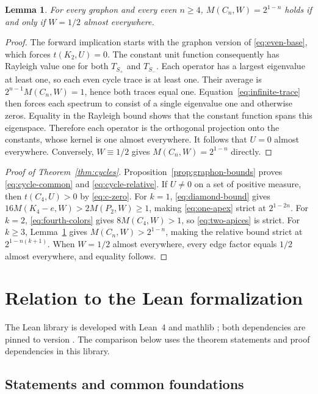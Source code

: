 \documentclass[11pt,a4paper]{article}
\newtheorem{lemma}[theorem]{Lemma}
\theoremstyle{remark}
\numberwithin{equation}{section}
\newcommand{\code}[1]{\texttt{\detokenize{#1}}}
\begin{document}
\begin{lemma}\label{lem:cycle-equality}
For every graphon and every even $n\geq4$,
$M(C_n,W)=2^{1-n}$ holds if and only if
$W=1/2$ almost everywhere.
\end{lemma}
\begin{proof}
The forward implication starts with the graphon version of
\eqref{eq:even-base}, which forces $t(K_2,U)=0$. The constant unit
function consequently has Rayleigh value one for both
$T_{S_+}$ and $T_{S_-}$. Each operator has a largest eigenvalue
at least one, so each even cycle trace is at least one.
Their average is $2^{n-1}M(C_n,W)=1$, hence both traces equal one.
Equation~\eqref{eq:infinite-trace} then forces each spectrum
to consist of a single eigenvalue one and otherwise zeros.
Equality in the Rayleigh bound shows that the constant function
spans this eigenspace. Therefore each operator is the orthogonal
projection onto the constants, whose kernel is one almost
everywhere. It follows that $U=0$ almost everywhere.
Conversely, $W\equiv1/2$ gives $M(C_n,W)=2^{1-n}$ directly.
\end{proof}

\begin{proof}[Proof of Theorem~\ref{thm:cycles}]
Proposition~\ref{prop:graphon-bounds} proves
\eqref{eq:cycle-common} and
\eqref{eq:cycle-relative}. If $U\ne0$ on a set of positive
measure, then $t(C_4,U)>0$ by \eqref{eq:c-zero}.
For $k=1$, \eqref{eq:diamond-bound} gives
$16M(K_4-e,W)>2M(P_2,W)\geq1$, making
\eqref{eq:one-apex} strict at $2^{1-2n}$.
For $k=2$, \eqref{eq:fourth-colors} gives $8M(C_4,W)>1$,
so \eqref{eq:two-apices} is strict.
For $k\geq3$, Lemma~\ref{lem:cycle-equality} gives
$M(C_n,W)>2^{1-n}$, making the relative bound strict at
$2^{1-n(k+1)}$.
When $W=1/2$ almost everywhere, every edge factor equals $1/2$
almost everywhere, and equality follows.
\end{proof}

\section{Relation to the Lean formalization}\label{sec:lean}

The Lean library \code{ApicesCommonness}
is developed with Lean~4 \cite{Lean4} and
mathlib \cite{Mathlib}; both dependencies are pinned to version
\code{v4.31.0}. The comparison below uses the theorem statements
and proof dependencies in this library.

\subsection{Statements and common foundations}
\end{document}
